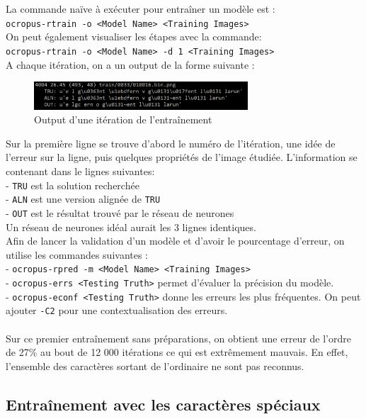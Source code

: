 \documentclass{article}
\begin{document}
La commande naïve à exécuter pour entraîner un modèle est : \\
\texttt{ocropus-rtrain -o <Model Name> <Training Images>} \\
On peut également visualiser les étapes avec la commande: \\
\texttt{ocropus-rtrain -o <Model Name> -d 1 <Training Images>} \\

\noindent A chaque itération, on a un output de la forme suivante : 

\begin{figure}[!h] 
    \center
    \includegraphics[width=8cm]{Screenshots/screen_output.png}
    \caption{Output d'une itération de l'entraînement}
    \label{API}
\end{figure}

Sur la première ligne se trouve d'abord le numéro de l'itération, une idée de l'erreur sur la ligne, puis quelques propriétés de l'image étudiée. L'information se contenant dans le lignes suivantes: \\
- \texttt{TRU} est la solution recherchée \\
- \texttt{ALN} est une version alignée de \texttt{TRU} \\
- \texttt{OUT} est le résultat trouvé par le réseau de neurones \\
Un réseau de neurones idéal aurait les 3 lignes identiques. \\

Afin de lancer la validation d'un modèle et d'avoir le pourcentage d'erreur, on utilise les commandes suivantes : \\
- \texttt{ocropus-rpred -m <Model Name> <Training Images>} \\
- \texttt{ocropus-errs <Testing Truth>} permet d'évaluer la précision du modèle. \\
- \texttt{ocropus-econf <Testing Truth>} donne les erreurs les plus fréquentes.
On peut ajouter \texttt{-C2} pour une contextualisation des erreurs. \\
\\
Sur ce premier entraînement sans préparations, on obtient une erreur de l'ordre de 27\% au bout de 12 000 itérations ce qui est extrêmement mauvais. En effet, l'ensemble des caractères sortant de l'ordinaire ne sont pas reconnus.

\subsection{Entraînement avec les caractères spéciaux}
\end{document}
